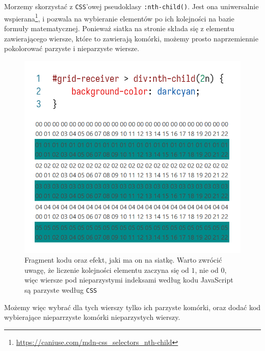 \documentclass[licencjacka]{pracadypl}
\begin{document}
Morzemy skorzystać z \texttt{CSS}'owej pseudoklasy \texttt{:nth-child()}. Jest ona uniwersalnie wspierana\footnote{\url{https://caniuse.com/mdn-css_selectors_nth-child}}, i pozwala na wybieranie elementów po ich kolejności na bazie formuły matematycznej. Ponieważ siatka na stronie składa się z elementu zawierającego wiersze, które to zawierają komórki, możemy prosto naprzemiennie pokolorować parzyste i nieparzyste wiersze.

\begin{figure}[H]
  \centering
  \includegraphics[width=\linewidth/\real{1.6}]{images/codeui-row-coloring.png}
  \caption{Fragment kodu oraz efekt, jaki ma on na siatkę. Warto zwrócić uwagę, że liczenie kolejności elementu zaczyna się od $1$, nie od $0$, więc wiersze pod nieparzystymi indeksami według kodu JavaScript są parzyste według \texttt{CSS}}
  \label{fig:codeui-row-coloring}
\end{figure}

Możemy więc wybrać dla tych wierszy tylko ich parzyste komórki, oraz dodać kod wybierające nieparrzyste komórki nieparzystych wierszy.
\end{document}
